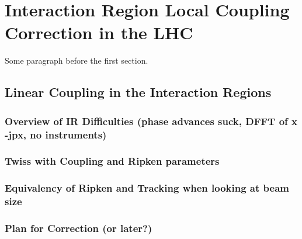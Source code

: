 
\chapter{Interaction Region Local Coupling Correction in the LHC} %

\label{Chapter3} %


\newcommand{\keyword}[1]{\textbf{#1}}
\newcommand{\tabhead}[1]{\textbf{#1}}
\newcommand{\code}[1]{\texttt{#1}}
\newcommand{\file}[1]{\texttt{\bfseries#1}}
\newcommand{\option}[1]{\texttt{\itshape#1}}


Some paragraph before the first section.


\section{Linear Coupling in the Interaction Regions}

\subsection{Overview of IR Difficulties (phase advances suck, DFFT of x -jpx, no instruments)}

\subsection{Twiss with Coupling and Ripken parameters}

\subsection{Equivalency of Ripken and Tracking when looking at beam size}

\subsection{Plan for Correction (or later?)}


